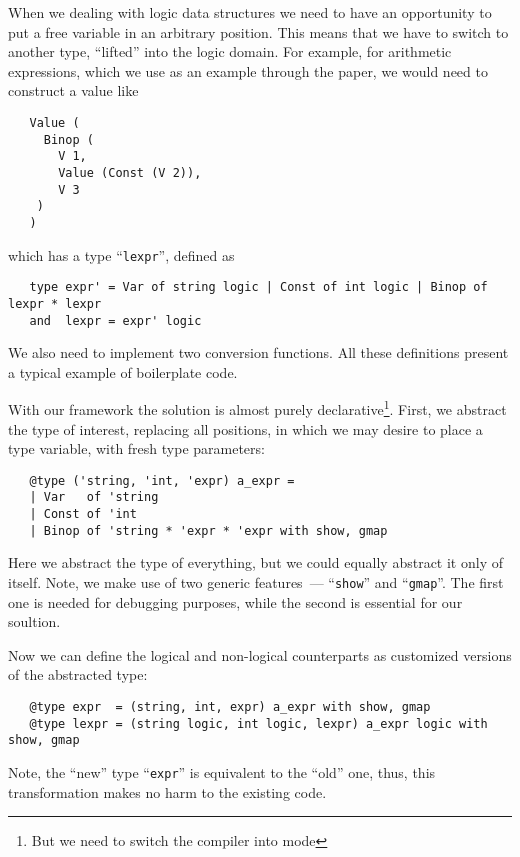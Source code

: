 When we dealing with logic data structures we need to have an opportunity to put a free variable in an arbitrary
position. This means that we have to switch to another type, ``lifted'' into the logic domain. For example,
for arithmetic expressions, which we use as an example through the paper, we would need to construct a value like

\begin{lstlisting}
   Value (
     Binop (
       V 1, 
       Value (Const (V 2)),
       V 3
    )
   )
\end{lstlisting}

which has a type ``\lstinline{lexpr}'', defined as

\begin{lstlisting}
   type expr' = Var of string logic | Const of int logic | Binop of lexpr * lexpr
   and  lexpr = expr' logic
\end{lstlisting}

We also need to implement two conversion functions. All these definitions present a typical example of boilerplate code.

With our framework the solution is almost purely declarative\footnote{But we need to switch the compiler into  mode}.
First, we abstract the type of interest, replacing all positions, in which we may desire to place a type variable, with
fresh type parameters:

\begin{lstlisting}
   @type ('string, 'int, 'expr) a_expr =
   | Var   of 'string
   | Const of 'int
   | Binop of 'string * 'expr * 'expr with show, gmap
\end{lstlisting}

Here we abstract the type of everything, but we could equally abstract it only of itself. Note, we make use of two
generic features~--- ``\lstinline{show}'' and ``\lstinline{gmap}''. The first one is needed for debugging purposes, while
the second is essential for our soultion.

Now we can define the logical and non-logical counterparts as customized versions of the abstracted type:

\begin{lstlisting}
   @type expr  = (string, int, expr) a_expr with show, gmap
   @type lexpr = (string logic, int logic, lexpr) a_expr logic with show, gmap
\end{lstlisting}

Note, the ``new'' type ``\lstinline{expr}'' is equivalent to the ``old'' one, thus, this transformation makes no
harm to the existing code.

